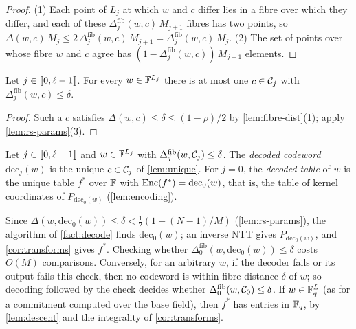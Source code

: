 \begin{proof}
(1) Each point of $L_j$ at which $w$ and $c$ differ lies in a fibre over which they differ, and each of these $\Delta^{\mathrm{fib}}_j(w,c)\,M_{j+1}$ fibres has two points, so $\Delta(w,c)\,M_j \le 2\,\Delta^{\mathrm{fib}}_j(w,c)\,M_{j+1} = \Delta^{\mathrm{fib}}_j(w,c)\,M_j$.
(2) The set of points over whose fibre $w$ and $c$ agree has $(1 - \Delta^{\mathrm{fib}}_j(w,c))\,M_{j+1}$ elements.
\end{proof}

\begin{lemma}\label{lem:unique}
Let $j \in \llbracket 0, \ell-1 \rrbracket$. For every $w \in \mathbb{F}^{L_j}$ there is at most one $c \in \mathcal{C}_j$ with $\Delta^{\mathrm{fib}}_j(w,c) \le \delta$.
\end{lemma}

\begin{proof}
Such a $c$ satisfies $\Delta(w,c) \le \delta \le (1-\rho)/2$ by \cref{lem:fibre-dist}(1); apply \cref{lem:rs-params}(3).
\end{proof}

\begin{definition}\label{def:decoded}
Let $j \in \llbracket 0, \ell-1 \rrbracket$ and $w \in \mathbb{F}^{L_j}$ with $\Delta^{\mathrm{fib}}_j(w, \mathcal{C}_j) \le \delta$.
The \emph{decoded codeword} $\mathrm{dec}_j(w)$ is the unique $c \in \mathcal{C}_j$ of \cref{lem:unique}.
For $j = 0$, the \emph{decoded table} of $w$ is the unique table $f^*$ over $\mathbb{F}$ with $\mathrm{Enc}(f^*) = \mathrm{dec}_0(w)$, that is, the table of kernel coordinates of $P_{\mathrm{dec}_0(w)}$ (\cref{lem:encoding}).
\end{definition}

\begin{remark}\label{rem:ext}
Since $\Delta(w, \mathrm{dec}_0(w)) \le \delta < \tfrac12(1 - (N-1)/M)$ (\cref{lem:rs-params}), the algorithm of \cref{fact:decode} finds $\mathrm{dec}_0(w)$; an inverse NTT gives $P_{\mathrm{dec}_0(w)}$, and \cref{cor:transforms} gives $f^*$.
Checking whether $\Delta^{\mathrm{fib}}_0(w, \mathrm{dec}_0(w)) \le \delta$ costs $O(M)$ comparisons.
Conversely, for an arbitrary $w$, if the decoder fails or its output fails this check, then no codeword is within fibre distance $\delta$ of $w$; so decoding followed by the check decides whether $\Delta^{\mathrm{fib}}_0(w, \mathcal{C}_0) \le \delta$.
If $w \in \mathbb{F}_q^L$ (as for a commitment computed over the base field), then $f^*$ has entries in $\mathbb{F}_q$, by \cref{lem:descent} and the integrality of \cref{cor:transforms}.
\end{remark}

